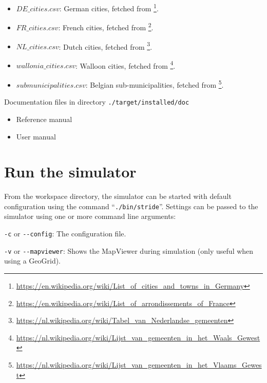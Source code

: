 \begin{compactitem}
\begin{itemize}
        \item $DE\_cities.csv$: German cities, fetched from \footnote{\url{https://en.wikipedia.org/wiki/List\_of\_cities\_and\_towns\_in\_Germany}}.
        \item $FR\_cities.csv$: French cities, fetched from \footnote{\url{https://en.wikipedia.org/wiki/List\_of\_arrondissements\_of\_France}}.
        \item $NL\_cities.csv$: Dutch cities, fetched from \footnote{\url{https://nl.wikipedia.org/wiki/Tabel\_van\_Nederlandse\_gemeenten}}.
        \item $wallonia\_cities.csv$: Walloon cities, fetched from \footnote{\url{https://nl.wikipedia.org/wiki/Lijst\_van\_gemeenten\_in\_het\_Waals\_Gewest}}.
        \item $submunicipalities.csv$: Belgian sub-municipalities, fetched from \footnote{\url{https://nl.wikipedia.org/wiki/Lijst\_van\_gemeenten\_in\_het\_Vlaams\_Gewest}}.
        \end{itemize}
    \item Documentation files
      	in directory \texttt{./target/installed/doc}
      	\begin{itemize}
        		\item Reference manual
        		\item User manual
        \end{itemize}
\end{compactitem}



\section{Run the simulator}


From the workspace directory, the simulator can be started with default configuration using the command \mbox{``\texttt{./bin/stride}''}. Settings can be passed to the simulator using one or more command line arguments:

\begin{compactitem}

\item \texttt{-c} or \texttt{{-}-config}: The configuration file.

\item \texttt{-v} or \texttt{{-}-mapviewer}: Shows the MapViewer during simulation (only useful when using a GeoGrid).

\end{compactitem}

